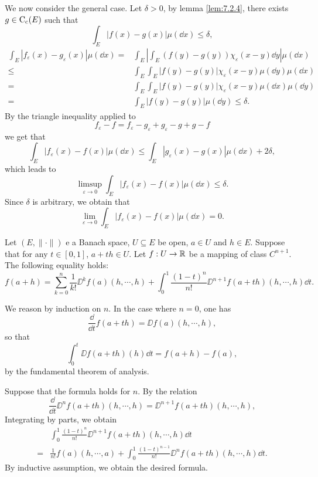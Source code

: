 \begin{proofenv}
\begin{enumerate}
            \quad We now consider the general case.
            Let $\delta > 0$, by lemma \ref{lem:7.2.4}, there exists $g \in \operatorname{C_{c}}(E)$ such that 
            $$\int_{E} |f(x) - g(x)|\mu(\dd x) \le \delta,$$
            $$\begin{aligned}
                \int_{E} |f_{\varepsilon}(x) - g_{\varepsilon}(x)| \mu(\dd x) = & \int_{E} \left|\int_{E} (f(y) - g(y))\chi_{\varepsilon}(x - y)\dd y\right| \mu(\dd x)\\
                \le & \int_{E} \int_{E} |f(y) - g(y)|\chi_{\varepsilon}(x-y)\mu(\dd y) \mu(\dd x)\\
                = & \int_{E} \int_{E} |f(y) - g(y)|\chi_{\varepsilon}(x-y)\mu(\dd x) \mu(\dd y)\\
                = & \int_{E} |f(y) - g(y)| \mu(\dd y) \le \delta.
            \end{aligned}$$
            By the triangle inequality applied to
            $$f_{\varepsilon} - f = f_{\varepsilon} - g_{\varepsilon} + g_{\varepsilon} - g + g - f$$
            we get that
            $$\int_{E} |f_{\varepsilon}(x) - f(x)| \mu(\dd x) \le \int_{E} |g_{\varepsilon}(x) - g(x)| \mu(\dd x) + 2 \delta,$$
            which leads to
            $$\limsup_{\varepsilon \to 0} \int_{E} |f_{\varepsilon}(x) - f(x)| \mu(\dd x) \le \delta.$$
            Since $\delta$ is arbitrary, we obtain that
            $$\lim_{\varepsilon \to 0} \int_{E} |f_{\varepsilon}(x) - f(x)| \mu(\dd x) = 0.$$
    \end{enumerate}
\end{proofenv}

\begin{theoremenv}\label{thm:7.2.6}
    Let $(E,\|\cdot\|)$ e a Banach space, $U \subseteq E$ be open,
    $a \in U$ and $h \in E$.
    Suppose that for any $t \in [0,1]$, $a + th \in U$.
    Let $f : U \rightarrow \mathbb{R}$ be a mapping of class $C^{n+1}$.
    The following equality holds:
    $$f(a + h) = \sum_{k=0}^{n} \frac{1}{k!} \DD^k f(a)(h,\cdots,h) + \int_{0}^{1}\frac{(1 - t)^n}{n!} \DD^{n+1}f(a + th)(h,\cdots,h)\dd t.$$
\end{theoremenv}
\begin{proofenv}
    We reason by induction on $n$.
    In the case where $n = 0$, one has
    $$\frac{\dd}{\dd t} f(a + th) = \DD f(a)(h,\cdots,h),$$
    so that
    $$\int_{0}^{t} \DD f(a + th)(h) \dd t = f(a + h) - f(a),$$
    by the fundamental theorem of analysis.

    \quad Suppose that the formula holds for $n$.
    By the relation
    $$\frac{\dd}{\dd t}\DD^n f(a + th)(h,\cdots,h) = \DD^{n+1}f(a + th)(h,\cdots,h),$$
    Integrating by parts, we obtain
    $$\begin{aligned}
        & \int_{0}^{1} \frac{(1 - t)^n}{n!} \DD^{n+1}f(a + th)(h,\cdots,h) \dd t\\
        = & \frac{1}{n!} f(a) (h,\cdots,a) + \int_{0}^{1} \frac{(1 - t)^{n-1}}{n!} \DD^n f(a + th)(h,\cdots,h) \dd t.
    \end{aligned}$$
    By inductive assumption, we obtain the desired formula.
\end{proofenv}

